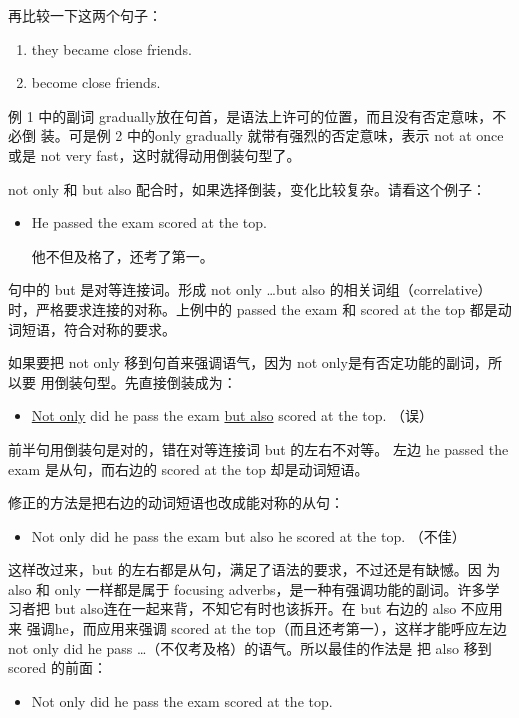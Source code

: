 再比较一下这两个句子：
\begin{enumerate}
\item {} they became close friends.
\item {} become close friends.
\end{enumerate}
例 1 中的副词 gradually放在句首，是语法上许可的位置，而且没有否定意味，不必倒
装。可是例 2 中的only gradually 就带有强烈的否定意味，表示 not at
once 或是 not very fast，这时就得动用倒装句型了。

not only 和 but also 配合时，如果选择倒装，变化比较复杂。请看这个例子：
\begin{itemize}
\item He  passed the exam  scored at the top.

  他不但及格了，还考了第一。
\end{itemize}
句中的 but 是对等连接词。形成 not only \ldots but also
的相关词组（correlative）时，严格要求连接的对称。上例中的 passed the
exam 和 scored at the top 都是动词短语，符合对称的要求。

如果要把 not only 移到句首来强调语气，因为 not only是有否定功能的副词，所以要
用倒装句型。先直接倒装成为：
\begin{itemize}
\item \ul{Not only} did he pass the exam \ul{but also} scored at the top. （误）
\end{itemize}

前半句用倒装句是对的，错在对等连接词 but 的左右不对等。 左边 he passed
the exam 是从句，而右边的 scored at the top 却是动词短语。

修正的方法是把右边的动词短语也改成能对称的从句：
\begin{itemize}
\item   Not only did he pass the exam but also he scored at the top. （不佳）
\end{itemize}
这样改过来，but 的左右都是从句，满足了语法的要求，不过还是有缺憾。因
为also 和 only 一样都是属于 focusing adverbs，是一种有强调功能的副词。许多学
习者把 but also连在一起来背，不知它有时也该拆开。在 but 右边的 also 不应用来
强调he，而应用来强调 scored at the top（而且还考第一），这样才能呼应左边 not
only did he pass \ldots（不仅考及格）的语气。所以最佳的作法是
把 also 移到scored 的前面：
\begin{itemize}
\item Not only did he pass the exam  scored at the top.
\end{itemize}


